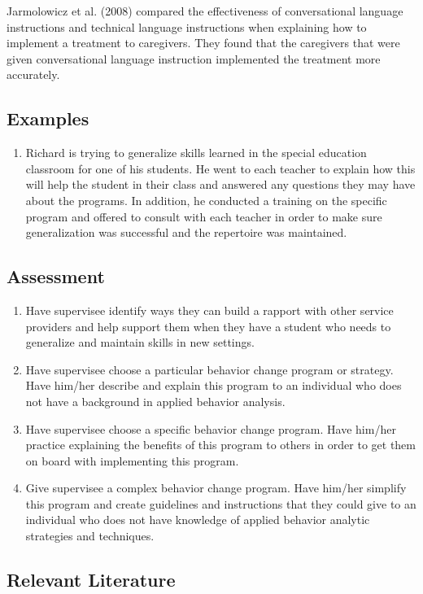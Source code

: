 Jarmolowicz et al. (2008) compared the effectiveness of conversational language instructions and technical language instructions when explaining how to implement a treatment to caregivers. They found that the caregivers that were given conversational language instruction implemented the treatment more accurately.
%
\subsection{Examples}
\begin{enumerate}
\item Richard is trying to generalize skills learned in the special education classroom for one of his students. He went to each teacher to explain how this will help the student in their class and answered any questions they may have about the programs. In addition, he conducted a training on the specific program and offered to consult with each teacher in order to make sure generalization was successful and the repertoire was maintained.
%
\end{enumerate}
%
\subsection{Assessment}
\begin{enumerate}
\item Have supervisee identify ways they can build a rapport with other service providers and help support them when they have a student who needs to generalize and maintain skills in new settings.
\item Have supervisee choose a particular behavior change program or strategy. Have him/her describe and explain this program to an individual who does not have a background in applied behavior analysis. 
\item Have supervisee choose a specific behavior change program. Have him/her practice explaining the benefits of this program to others in order to get them on board with implementing this program.
\item Give supervisee a complex behavior change program. Have him/her simplify this program and create guidelines and instructions that they could give to an individual who does not have knowledge of applied behavior analytic strategies and techniques. 
\end{enumerate}
%
\subsection{Relevant Literature}
\begin{refsection}
\nocite{cooper2007applied,
        jarmolowicz2008effects,
        stokes1974programming}
\printbibliography[heading=none]
\end{refsection}
%

